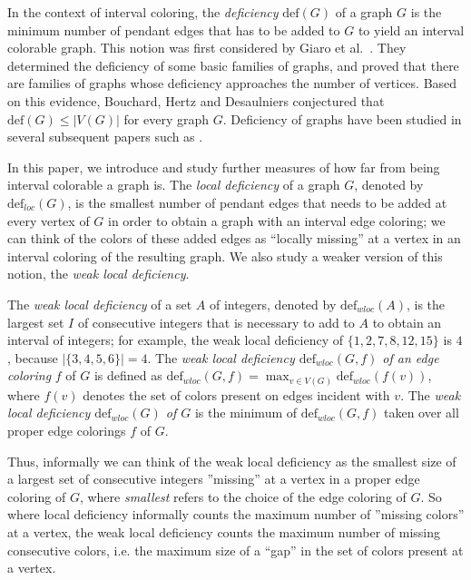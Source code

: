 \documentclass[12pt]{article}
\theoremstyle{plain}
\theoremstyle{definition}
\newcommand{\defi}{\mathrm{def}}
\numberwithin{equation}{section}
\begin{document}
In the context of interval coloring, the {\em deficiency} $\text{def}(G)$ of a graph $G$ is the minimum number
of pendant edges that has to be added to $G$ to yield an interval colorable graph. This notion 
was first considered by Giaro et al.~\cite{GiaroKubaleMalaf1, GiaroKubaleMalaf2}. They determined
the deficiency of some basic families of graphs, and proved that there are families of graphs 
whose deficiency approaches the number of vertices. Based on this evidence, Bouchard, Hertz and Desaulniers \cite{BouchardHertz} conjectured that $\defi(G) \leq |V(G)|$ for every graph $G$. Deficiency of graphs have been studied in several subsequent papers such as \cite{Schwartz, B-OD-BHal, BorowieckaDrgas, Hrant, BouchardHertz, PetrosHrant2}.


In this paper, we introduce and study further measures of how far from being interval colorable a graph is. 
The {\em local deficiency} of a graph $G$, denoted by $\mathrm{def}_{loc}(G)$, is the smallest number of pendant edges that needs to be added at every vertex of $G$ in order to obtain
a graph with an interval edge coloring; we can think of the colors of these
added edges as ``locally missing'' at a vertex in an interval coloring of the resulting graph.
We also study a weaker version of this notion, the {\em weak local deficiency}.


The {\em weak local deficiency} of a set $A$ of integers, denoted by $\mathrm{def}_{wloc}(A)$, is the largest set $I$ of consecutive integers that is necessary to add to $A$ to obtain an interval of integers; for example, the weak local deficiency
of $\{1,2,7,8,12,15\}$ is $4$, because $|\{3,4,5,6\}|=4$.
The {\em weak local deficiency $\mathrm{def}_{wloc}(G,f)$ of an edge coloring} $f$ of $G$ 
is defined as $\mathrm{def}_{wloc}(G,f)=\max_{v\in V(G)} \mathrm{def}_{wloc}(f(v))$, where
$f(v)$ denotes the set of colors present on edges incident with $v$.
The {\em weak local deficiency $\mathrm{def}_{wloc}(G)$ of $G$} is the minimum of
$\mathrm{def}_{wloc}(G,f)$ taken over all proper edge colorings $f$ of $G$.


Thus,
informally we can think of the weak local deficiency as the smallest size of a 
largest set of consecutive integers ''missing'' at
a vertex in a proper edge coloring of $G$, where {\em smallest} refers to the choice of the edge coloring of $G$.
So where local deficiency informally
counts the maximum number of ''missing colors'' at a vertex, the weak local deficiency
counts the maximum number of missing consecutive colors, i.e. the maximum size of a ``gap''
in the set of colors present at a vertex.
\end{document}
